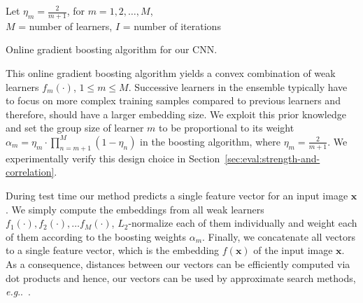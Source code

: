 \documentclass[10pt,journal,compsoc]{IEEEtran}
\makeatletter
\DeclareRobustCommand\onedot{\futurelet\@let@token\@onedot}
\def\@onedot{\ifx\@let@token.\else.\null\fi\xspace}
\def\eg{\emph{e.g}\onedot} \def\Eg{\emph{E.g}\onedot}
\makeatother
\begin{document}
\begin{algorithm}[htbp]
    Let $\eta_m = \frac{2}{m+1}$,  for $m = 1,2,\ldots,M$, \\
    $M$ = number of learners, 
    $I$ = number of iterations \\
    
    \label{algo:training}
    \caption{Online gradient boosting algorithm for our \ac{CNN}.}
\end{algorithm}This online gradient boosting algorithm yields a convex combination of weak learners $f_m(\cdot)$, $1 \le m \le M$. 
Successive learners in the ensemble typically have to focus on more complex training samples compared to previous learners and 
therefore, should have a larger embedding size.
We exploit this prior knowledge
and set the group size of learner $m$ to be proportional to its weight ${\alpha_m = \eta_m \cdot \prod_{n=m+1}^M (1-\eta_n)}$ in the boosting algorithm, where $\eta_m = \frac{2}{m + 1}$.
We experimentally verify this design choice in Section~\ref{sec:eval:strength-and-correlation}.

During test time our method predicts a single feature vector for an input
image $\boldsymbol{x}$.  We simply compute the embeddings from all
weak learners $f_1(\cdot), f_2(\cdot), \ldots f_M(\cdot)$, $L_2$-normalize each
of them individually and weight each of them according to 
the boosting weights $\alpha_m$. Finally, we concatenate all vectors to a
single feature vector, which is the embedding $f(\boldsymbol{x})$ of the input
image $\boldsymbol{x}$. As a consequence, distances between our vectors can 
be efficiently computed via dot products and hence, our vectors can be used by approximate search
methods, \eg~\cite{muja2014scalable}.
\end{document}
